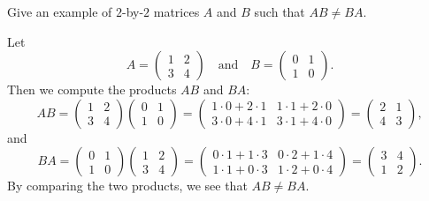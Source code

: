 \begin{exercise}[3c10]
    Give an example of $2$-by-$2$ matrices $A$ and $B$ such that $AB \neq BA$.
\end{exercise}

\begin{sol}
    Let 
    \[A =
    \begin{pmatrix}
        1 & 2 \\
        3 & 4
    \end{pmatrix} \quad \text{and} \quad B = 
    \begin{pmatrix}
        0 & 1 \\
        1 & 0
    \end{pmatrix}.\]
    Then we compute the products $AB$ and $BA$:
    \[AB = 
    \begin{pmatrix}
        1 & 2 \\
        3 & 4
    \end{pmatrix} 
    \begin{pmatrix}
        0 & 1 \\
        1 & 0
    \end{pmatrix} 
    = 
    \begin{pmatrix}
        1 \cdot 0 + 2 \cdot 1 & 1 \cdot 1 + 2 \cdot 0 \\
        3 \cdot 0 + 4 \cdot 1 & 3 \cdot 1 + 4 \cdot 0
    \end{pmatrix} 
    = 
    \begin{pmatrix}
        2 & 1 \\
        4 & 3
    \end{pmatrix},\]
    and
    \[BA = 
    \begin{pmatrix}
        0 & 1 \\
        1 & 0
    \end{pmatrix} 
    \begin{pmatrix}
        1 & 2 \\
        3 & 4
    \end{pmatrix} 
    = 
    \begin{pmatrix}
        0 \cdot 1 + 1 \cdot 3 & 0 \cdot 2 + 1 \cdot 4 \\
        1 \cdot 1 + 0 \cdot 3 & 1 \cdot 2 + 0 \cdot 4
    \end{pmatrix} 
    = 
    \begin{pmatrix}
        3 & 4 \\
        1 & 2
    \end{pmatrix}.\]
    By comparing the two products, we see that $AB \neq BA$.
\end{sol}

